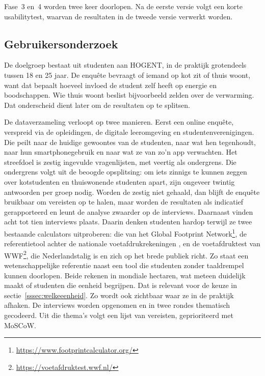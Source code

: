 \documentclass{hogent-article}
\begin{document}
    Fase~3 en~4 worden twee keer doorlopen. Na de eerste versie volgt een korte
    usabilitytest, waarvan de resultaten in de tweede versie verwerkt worden.
    
    \subsection{Gebruikersonderzoek}%
    \label{ssec:gebruikersonderzoek}
    
    De doelgroep bestaat uit studenten aan HOGENT, in de praktijk grotendeels tussen
    18 en 25 jaar. De enquête bevraagt of iemand op kot zit of thuis woont, want dat
    bepaalt hoeveel invloed de student zelf heeft op energie en boodschappen. Wie
    thuis woont beslist bijvoorbeeld zelden over de verwarming. Dat onderscheid
    dient later om de resultaten op te splitsen.
    
    De dataverzameling verloopt op twee manieren. Eerst een online enquête,
    verspreid via de opleidingen, de digitale leeromgeving en
    studentenverenigingen. Die peilt naar de huidige gewoontes van de studenten,
    naar wat hen tegenhoudt, naar hun smartphonegebruik en naar wat ze van zo'n app
    verwachten. Het streefdoel is zestig ingevulde vragenlijsten, met veertig als
    ondergrens. Die ondergrens volgt uit de beoogde opsplitsing: om iets zinnigs te
    kunnen zeggen over kotstudenten en thuiswonende studenten apart, zijn ongeveer
    twintig antwoorden per groep nodig. Worden de zestig niet gehaald, dan blijft de
    enquête bruikbaar om vereisten op te halen, maar worden de resultaten als
    indicatief gerapporteerd en leunt de analyse zwaarder op de interviews.
    Daarnaast vinden acht tot tien interviews plaats. Daarin denken studenten hardop
    terwijl ze twee bestaande calculators uitproberen: die van het Global Footprint
    Network\footnote{\url{https://www.footprintcalculator.org/}}, de referentietool
    achter de nationale voetafdrukrekeningen \autocite{Lin2018}, en de
    voetafdruktest van WWF\footnote{\url{https://voetafdruktest.wwf.nl/}}, die
    Nederlandstalig is en zich op het brede publiek richt. Zo staat een
    wetenschappelijke referentie naast een tool die studenten zonder taaldrempel
    kunnen doorlopen. Beide rekenen in mondiale hectaren, wat meteen duidelijk maakt
    of studenten die eenheid begrijpen. Dat is relevant voor de keuze in
    sectie~\ref{sssec:welkeeenheid}. Zo wordt ook zichtbaar waar ze in de praktijk
    afhaken. De interviews worden opgenomen en in twee rondes thematisch gecodeerd.
    Uit die thema's volgt een lijst van vereisten, geprioriteerd met MoSCoW.
    
\end{document}
